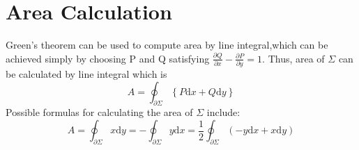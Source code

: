 \documentclass[a4paper]{article}
\begin{document}
\part{Area Calculation}
Green's theorem can be used to compute area by line integral,which can be achieved simply by choosing P and Q satisfying $\frac{\partial Q}{\partial x}-\frac{\partial P}{\partial y}=1$.
Thus, area of $\Sigma$ can be calculated by line integral which is 
\begin{equation}
A=\oint_{\partial\Sigma} \left\lbrace P\mathrm{d}x+Q\mathrm{d}y\right\rbrace
\end{equation}
Possible formulas for calculating the area of $\Sigma$ include:
\[
A=\oint_{\partial\Sigma} x\mathrm{d}y=-\oint_{\partial\Sigma} y\mathrm{d}x=\frac{1}{2}\oint_{\partial\Sigma}\left(-y\mathrm{d}x+x\mathrm{d}y\right)
\]
\end{document}
